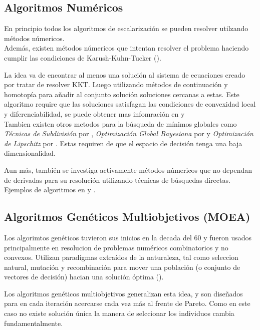 \subsection{Algoritmos Num\'ericos}

En principio todos los algoritmos de escalarizaci\'on se pueden resolver utilzando m\'etodos n\'umericos.\\

Adem\'as, existen m\'etodos n\'umericos que intentan resolver el problema haciendo cumplir las condiciones de Karush-Kuhn-Tucker (\cite{kuhn2014nonlinear}).

La idea va de encontrar al menos una soluci\'on al sistema de ecuaciones creado por tratar de resolver KKT. Luego utilizando m\'etodos de continuaci\'on y homotop\'ia para añadir al conjunto soluci\'on soluciones cercanas a estas. Este algoritmo require que las soluciones satisfagan las condiciones de convexidad local y diferenciabilidad, se puede obtener mas infomraci\'on en \cite{hillermeier2001nonlinear} y \cite{schutze_et_al:DagSemProc.04461.16}\\

Tambien existen otros metodos para la b\'usqueda de m\'inimos globales como \textit{T\'ecnicas de Subdivisi\'on} por \cite{dellnitz2005covering}, \textit{Optimizaci\'on Global Bayesiana} por \cite{emmerich2016multicriteria} y \textit{Optimizaci\'on de Lipschitz} por \cite{vzilinskas2013worst}. Estas requiren de que el espacio de decisi\'on tenga una baja dimensionalidad.

Aun m\'as, tambi\'en se investiga activamente m\'etodos n\'umericos que no dependan de derivadas para su resoluci\'on utilizando t\'ecnicas de b\'usquedas directas. Ejemplos de algoritmos en \cite{custodio2011direct} y \cite{audet2010mesh}.

\subsection{Algoritmos Gen\'eticos Multiobjetivos (MOEA)}

Los algorimtos gen\'eticos tuvieron sus inicios en la decada del 60 y fueron usados principalmente en resolucion de problemas num\'ericos combinatorios y no convexos. Utilizan paradigmas extra\'idos de la naturaleza, tal como seleccion natural, mutaci\'on y recombinaci\'on para mover una poblaci\'on (o conjunto de vectores de decisi\'on) hacian una soluci\'on \'optima (\cite{back1996evolutionary}).

Los algoritmos gen\'eticos multiobjetivos generalizan esta idea, y son diseñados para en cada iteraci\'on acercarse cada vez m\'as al frente de Pareto. Como en este caso no existe soluci\'on \'unica la manera de selccionar los individuos cambia fundamentalmente.

